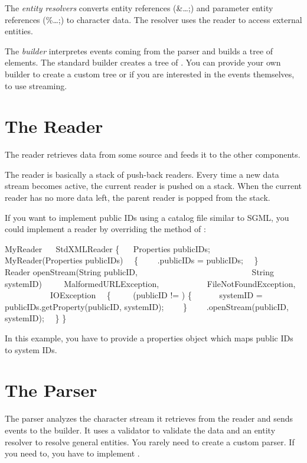 The \emph{entity resolvers} converts entity references (\&\ldots;) and parameter entity references (\%\ldots;) to character data.
The resolver uses the reader to access external entities.

The \emph{builder} interpretes \XML{} events coming from the parser and builds a tree of \XML{} elements.
The standard builder creates a tree of .
You can provide your own builder to create a custom tree or if you are interested in the \XML{} events themselves,  to use \XML{} streaming.


\section{The \NanoXML{} Reader}

The reader retrieves data from some source and feeds it to the other components.

The reader is basically a stack of push-back readers.
Every time a new data stream becomes active, the current reader is pushed on a stack.
When the current reader has no more data left, the parent reader is popped from the stack.

If you want to implement public IDs using  a catalog file similar to SGML, you could implement a reader by overriding the method  of :

\begin{example}
 MyReader
~~ StdXMLReader
\{
~~ Properties publicIDs;
~
~~ MyReader(Properties publicIDs)
~~\{
~~~~.publicIDs = publicIDs;
~~\}
~
~~ Reader openStream(String publicID,
~~~~~~~~~~~~~~~~~~~~~~~~~~~String systemID)
~~~~ MalformedURLException,
~~~~~~~~~~~FileNotFoundException,
~~~~~~~~~~~IOException
~~\{
~~~~ (publicID != ) \{
~~~~~~systemID = publicIDs.getProperty(publicID, systemID);
~~~~\}
~~~~.openStream(publicID, systemID);
~~\}
\}
\end{example}

In this example, you have to provide a properties object which maps public IDs to system IDs.


\section{The \NanoXML{} Parser}

The parser analyzes the character stream it retrieves from the reader and sends \XML{} events to the builder.
It uses a validator to validate the data and an entity resolver to resolve general entities.
You rarely need to create a custom parser.
If you need to, you have to implement .


